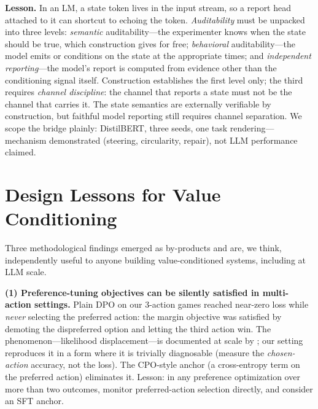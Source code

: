 \documentclass[manuscript, screen, review]{jair}
\begin{document}
\textbf{Lesson.} In an LM, a state token lives in the input stream, so a report head attached to it can shortcut to echoing the token. \emph{Auditability} must be unpacked into three levels: \emph{semantic} auditability---the experimenter knows when the state should be true, which construction gives for free; \emph{behavioral} auditability---the model emits or conditions on the state at the appropriate times; and \emph{independent reporting}---the model's report is computed from evidence other than the conditioning signal itself. Construction establishes the first level only; the third requires \emph{channel discipline}: the channel that reports a state must not be the channel that carries it. The state semantics are externally verifiable by construction, but faithful model reporting still requires channel separation. We scope the bridge plainly: DistilBERT, three seeds, one task rendering---mechanism demonstrated (steering, circularity, repair), not LLM performance claimed.

\section{Design Lessons for Value Conditioning}
\label{sec:lessons}

Three methodological findings emerged as by-products and are, we think, independently useful to
anyone building value-conditioned systems, including at LLM scale.

\textbf{(1) Preference-tuning objectives can be silently satisfied in multi-action settings.}
Plain DPO on our 3-action games reached near-zero loss while \emph{never} selecting the preferred
action: the margin objective was satisfied by demoting the dispreferred option and letting the
third action win. The phenomenon---likelihood displacement---is documented at scale
by \citet{razin2024unintentional}; our setting reproduces it in a form where it is
trivially diagnosable (measure the \emph{chosen-action} accuracy, not the loss). The CPO-style
anchor (a cross-entropy term on the preferred action) eliminates it. Lesson: in any preference
optimization over more than two outcomes, monitor preferred-action selection directly, and
consider an SFT anchor.
\end{document}
